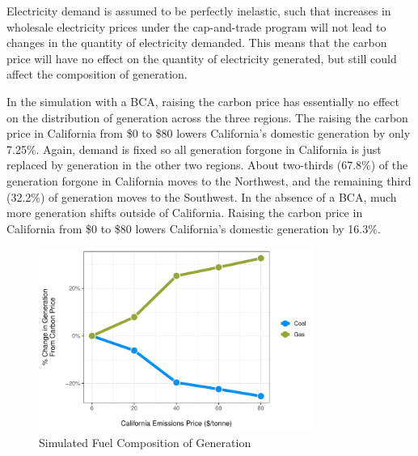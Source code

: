 Electricity demand is assumed to be perfectly inelastic, such that increases in wholesale electricity prices under the cap-and-trade program will not lead to changes in the quantity of electricity demanded. This means that the carbon price will have no effect on the quantity of electricity generated, but still could affect the composition of generation. 



In the simulation with a BCA, raising the carbon price has essentially no effect on the distribution of generation across the three regions. The raising the carbon price in California from \$0 to \$80 lowers California's domestic generation by only 7.25\%. Again, demand is fixed so all generation forgone in California is just replaced by generation in the other two regions. About two-thirds (67.8\%) of the generation forgone in California moves to the Northwest, and the remaining third (32.2\%) of generation moves to the Southwest. In the absence of a BCA, much more generation shifts outside of California. Raising the carbon price in California from \$0 to \$80 lowers California's domestic generation by 16.3\%. 

\begin{figure}
    \centering
    \caption{Simulated Fuel Composition of Generation \label{gen_fuel_bca_pct}}
    \includegraphics[width=0.8\textwidth]{figures/chapter5_figures/gen_fuel_bca_pct.pdf}
\end{figure}

